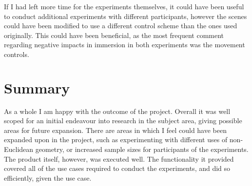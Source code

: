 		If I had left more time for the experiments themselves, it could have been useful to conduct additional experiments with different participants, however the scenes could have been modified to use a different control scheme than the ones used originally.
		This could have been beneficial, as the most frequent comment regarding negative impacts in immersion in both experiments was the movement controls.


	\section{Summary}

		As a whole I am happy with the outcome of the project.
		Overall it was well scoped for an initial endeavour into research in the subject area, giving possible areas for future expansion.
		There are areas in which I feel could have been expanded upon in the project, such as experimenting with different uses of non-Euclidean geometry, or increased sample sizes for participants of the experiments.
		The product itself, however, was executed well.
		The functionality it provided covered all of the use cases required to conduct the experiments, and did so efficiently, given the use case.

